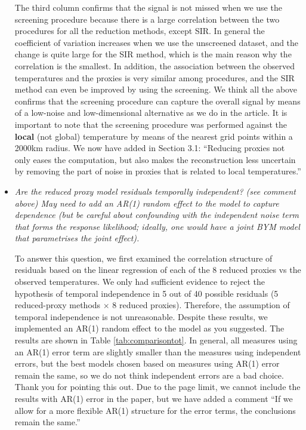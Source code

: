 \documentclass[11pt]{article}
\newcommand{\bl}[1]{\color{red}\textbf{[Bo: #1]}\normalcolor}
\begin{document}
\begin{itemize}
The third column confirms that the signal is not missed when we
use the screening procedure because there is a large correlation between the two
procedures for all the reduction methods, except SIR. In general the coefficient
of variation increases when we use the unscreened dataset, and the change is
quite large for the SIR method, which is the main reason why the correlation is
the smallest. In addition, the association between the observed temperatures and
the proxies is very similar among procedures, and the SIR method can even be improved
by using the screening. We think all the above confirms that the screening procedure can capture
the overall signal by means of a low-noise and low-dimensional alternative as we
do in the article. It is important to note that the screening procedure was
performed against the \textbf{local} (not global) temperature by means of the nearest grid points
within a 2000km radius. We now have added in Section 3.1: ``Reducing proxies not only eases the computation, but
also makes the reconstruction less uncertain by removing the part of noise in
proxies that is related to local temperatures.'' 




\item \textit{Are the reduced proxy model residuals temporally independent? (see
  comment above) May need to add an AR(1) random effect to the model to capture
  dependence (but be careful about confounding with the independent
  noise term that forms the response likelihood; ideally, one would
  have a joint BYM model that parametrises the joint effect).}

To answer this question, we first examined the correlation structure of residuals based on the linear regression of
each of the 8 reduced proxies vs the observed temperatures. We only had sufficient
evidence to reject the hypothesis of temporal independence in 5 out of 40
possible residuals (5 reduced-proxy methods $\times$ 8 reduced proxies). Therefore, the assumption of temporal independence is not unreasonable. Despite these results, we implemented an AR(1) random effect to the model as you
suggested. The results are shown in Table \ref{tab:comparisontot}. In general, 
all measures using an AR(1) error term are slightly smaller than the measures using independent errors, but the best
models chosen based on measures using AR(1) error remain the same, so we do not think independent errors are a bad choice. Thank you for pointing this out. Due to the page limit, we cannot include the results with AR(1) error in the paper, but we have added a comment ``If we allow for a more flexible AR(1) structure for the error terms, the conclusions remain the same.''



\end{itemize}
\end{document}
